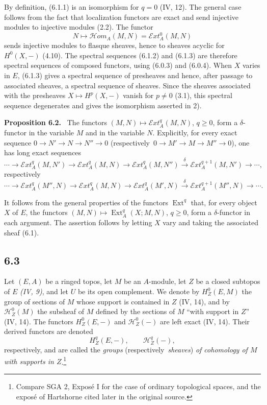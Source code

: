 \documentclass[11pt]{article}
\newcommand{\Hh}{\mathcal{H}}
\newcommand{\Ext}{\operatorname{Ext}}
\newcommand{\Hhom}{\mathcal{H}om}
\newcommand{\Eext}{\mathcal{E}xt}
\newcommand{\resp}{respectively}
\newenvironment{statement}[1]{\par\medskip\noindent\textbf{#1.}\ }{\par\medskip}
\begin{document}
By definition, (6.1.1) is an isomorphism for $q=0$ (IV, 12). The general case follows from the fact that localization functors are exact and send injective modules to injective modules (2.2). The functor
\[
        N\longmapsto \Hhom_A(M,N)=\Eext_A^0(M,N)
\]
sends injective modules to flasque sheaves, hence to sheaves acyclic for $H^0(X,-)$ (4.10). The spectral sequences (6.1.2) and (6.1.3) are therefore spectral sequences of composed functors, using (6.0.3) and (6.0.4). When $X$ varies in $E$, (6.1.3) gives a spectral sequence of presheaves and hence, after passage to associated sheaves, a spectral sequence of sheaves. Since the sheaves associated with the presheaves $X\mapsto H^p(X,-)$ vanish for $p\neq 0$ (3.1), this spectral sequence degenerates and gives the isomorphism asserted in 2).

\begin{statement}{Proposition 6.2}
The functors $(M,N)\mapsto \Eext_A^q(M,N)$, $q\geq 0$, form a $\delta$-functor in the variable $M$ and in the variable $N$. Explicitly, for every exact sequence $0\to N'\to N\to N''\to 0$ (\resp\ $0\to M'\to M\to M''\to 0$), one has long exact sequences
\begin{equation*}
\cdots\to \Eext_A^q(M,N')\to \Eext_A^q(M,N)\to \Eext_A^q(M,N'')\xrightarrow{\delta}\Eext_A^{q+1}(M,N')\to\cdots,\tag{6.2.1}
\end{equation*}
respectively
\begin{equation*}
\cdots\to \Eext_A^q(M'',N)\to \Eext_A^q(M,N)\to \Eext_A^q(M',N)\xrightarrow{\delta}\Eext_A^{q+1}(M'',N)\to\cdots .\tag{6.2.2}
\end{equation*}
\end{statement}

It follows from the general properties of the functors $\Ext^q$ that, for every object $X$ of $E$, the functors $(M,N)\mapsto \Ext_A^q(X;M,N)$, $q\geq 0$, form a $\delta$-functor in each argument. The assertion follows by letting $X$ vary and taking the associated sheaf (6.1).

\subsection*{6.3}
Let $(E,A)$ be a ringed topos, let $M$ be an $A$-module, let $Z$ be a closed subtopos of $E$ \emph{(IV, 9)}, and let $U$ be its open complement. We denote by $H_Z^0(E,M)$ the group of sections of $M$ whose support is contained in $Z$ (IV, 14), and by $\Hh_Z^0(M)$ the subsheaf of $M$ defined by the sections of $M$ ``with support in $Z$'' (IV, 14). The functors $H_Z^0(E,-)$ and $\Hh_Z^0(-)$ are left exact (IV, 14). Their derived functors are denoted
\[
        H_Z^q(E,-),\qquad \Hh_Z^q(-),
\]
respectively, and are called the \emph{groups} (\resp\ \emph{sheaves}) \emph{of cohomology of $M$ with supports in $Z$}.\footnote{Compare SGA 2, Expos\'e I for the case of ordinary topological spaces, and the expos\'e of Hartshorne cited later in the original source.}
\end{document}
